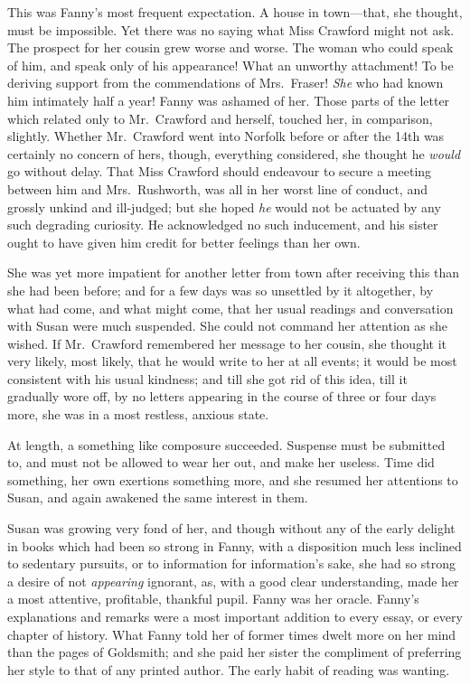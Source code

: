 \documentclass{article}
\begin{document}
This was Fanny's most frequent expectation.  A house
in town---that, she thought, must be impossible.
Yet there was no saying what Miss Crawford might not ask.
The prospect for her cousin grew worse and worse.
The woman who could speak of him, and speak only of
his appearance!  What an unworthy attachment!  To be
deriving support from the commendations of Mrs.\ Fraser!
\emph{She} who had known him intimately half a year!
Fanny was ashamed of her.  Those parts of the letter which
related only to Mr.\ Crawford and herself, touched her,
in comparison, slightly.  Whether Mr.\ Crawford went
into Norfolk before or after the 14th was certainly
no concern of hers, though, everything considered,
she thought he \emph{would} go without delay.  That Miss
Crawford should endeavour to secure a meeting between him
and Mrs.\ Rushworth, was all in her worst line of conduct,
and grossly unkind and ill-judged; but she hoped \emph{he}
would not be actuated by any such degrading curiosity.
He acknowledged no such inducement, and his sister
ought to have given him credit for better feelings than
her own.

She was yet more impatient for another letter from
town after receiving this than she had been before;
and for a few days was so unsettled by it altogether,
by what had come, and what might come, that her usual
readings and conversation with Susan were much suspended.
She could not command her attention as she wished.
If Mr.\ Crawford remembered her message to her cousin,
she thought it very likely, most likely, that he would write
to her at all events; it would be most consistent with his
usual kindness; and till she got rid of this idea, till it
gradually wore off, by no letters appearing in the course
of three or four days more, she was in a most restless,
anxious state.

At length, a something like composure succeeded.
Suspense must be submitted to, and must not be allowed
to wear her out, and make her useless.  Time did something,
her own exertions something more, and she resumed her
attentions to Susan, and again awakened the same interest
in them.

Susan was growing very fond of her, and though without
any of the early delight in books which had been
so strong in Fanny, with a disposition much less
inclined to sedentary pursuits, or to information for
information's sake, she had so strong a desire of not
\emph{appearing} ignorant, as, with a good clear understanding,
made her a most attentive, profitable, thankful pupil.
Fanny was her oracle.  Fanny's explanations and remarks
were a most important addition to every essay, or every
chapter of history.  What Fanny told her of former times
dwelt more on her mind than the pages of Goldsmith; and she
paid her sister the compliment of preferring her style
to that of any printed author.  The early habit of reading was
wanting.
\end{document}
